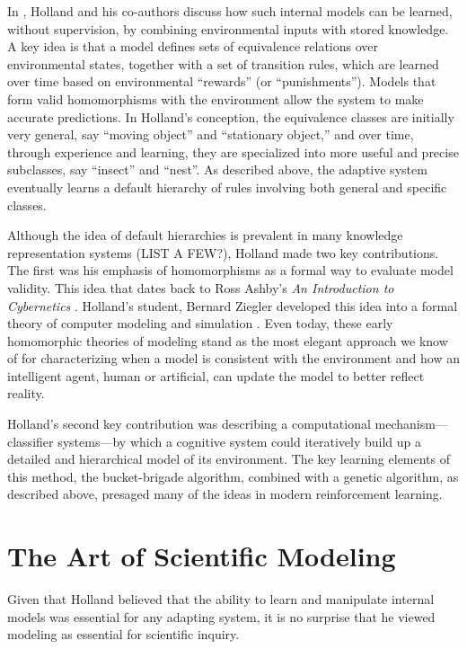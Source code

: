 \documentclass{sig-alternate}
\begin{document}
In \cite{Holland1989}, Holland and his co-authors discuss how such
internal models can be learned, without supervision, by combining
environmental inputs with stored knowledge.  A key idea is that a
model defines sets of equivalence relations over environmental states,
together with a set of transition rules, which are learned over time
based on environmental ``rewards'' (or ``punishments'').  Models that
form valid homomorphisms with the environment allow the system to make
accurate predictions.  In Holland's conception, the equivalence
classes are initially very general, say ``moving object'' and
``stationary object,'' and over time, through experience and learning,
they are specialized into more useful and precise subclasses, say
``insect'' and ``nest''.  As described above, the adaptive system
eventually learns a default hierarchy of rules involving both general
and specific classes.  

Although the idea of default hierarchies is prevalent in many
knowledge representation systems (LIST A FEW?), Holland made two key
contributions.  The first was his emphasis of homomorphisms as a formal way to
evaluate model validity.  This idea that dates back to Ross Ashby's
\emph{An Introduction to Cybernetics} \cite{Ashby1956}. Holland's student,
Bernard Ziegler developed this idea into a formal theory of computer modeling
and simulation \cite{Ziegler1976}.  
Even today, these early homomorphic theories of modeling
stand as the most elegant approach we know of for characterizing when
a model is consistent with the environment and how an intelligent
agent, human or artificial, can update the model to better reflect
reality.

Holland's second key contribution was describing a computational
mechanism---classifier systems---by which a cognitive system could
iteratively build up a detailed and hierarchical model of its
environment.  The key learning elements of this method, the
bucket-brigade algorithm, combined with a genetic algorithm, as
described above, presaged many of the ideas in modern reinforcement
learning.

\section{The Art of Scientific Modeling}

Given that Holland believed that the ability to learn and manipulate
internal models was essential for any adapting system, it is no
surprise that he viewed modeling as essential for scientific inquiry.
\end{document}

